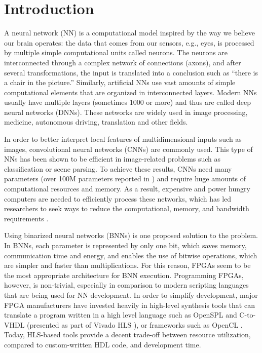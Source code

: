 \documentclass[conference]{IEEEtran}
\begin{document}
	\section{Introduction}
	A neural network (NN) \cite{Caudill:1989:NNP:69737.69743} \cite{Patterson:1998:ANN:521611} is a computational model inspired by the way we believe our brain operates: the data that comes from our sensors, e.g., eyes, is processed by multiple simple computational units called neurons. The neurons are interconnected through a complex network of connections (axons), and after several transformations, the input is translated into a conclusion such as ``there is a chair in the picture.'' Similarly, artificial NNs use vast amounts of simple computational elements that are organized in interconnected layers. Modern NNs usually have multiple layers (sometimes 1000 \cite{he2016deep} or more) and thus are called deep neural networks (DNNs). These networks are widely used in image processing, medicine, autonomous driving, translation and other fields.
	
	In order to better interpret local features of multidimensional inputs such as images, convolutional neural networks (CNNs) are commonly used. This type of NNs has been shown to be efficient in image-related problems such as classification or scene parsing. To achieve these results, CNNs need many parameters (over 100M parameters reported in \cite{DBLP:journals/corr/SimonyanZ14a}) and require huge amounts of computational resources and memory. As a result, expensive and power hungry computers are needed to efficiently process these networks, which has led researchers to seek ways to reduce the computational, memory, and bandwidth requirements \cite{DBLP:journals/corr/CourbariauxBD14} \cite{chen2015compressing} \cite{DBLP:journals/corr/HanMD15} \cite{gupta2015deep} \cite{DBLP:journals/corr/IandolaMAHDK16}.
	
	Using binarized neural networks (BNNs) \cite{golea1992learning} \cite{DBLP:journals/corr/KimS16} \cite{courbariaux2015binaryconnect} is one proposed solution to the problem. In BNNs, each parameter is represented by only one bit, which saves memory, communication time and energy, and enables the use of bitwise operations, which are simpler and faster than multiplications. For this reason, FPGAs seem to be the most appropriate architecture for BNN execution. Programming FPGAs, however, is non-trivial, especially in comparison to modern scripting languages that are being used for NN development. In order to simplify development, major FPGA manufacturers have invested heavily in high-level synthesis tools that can translate a program written in a high level language such as OpenSPL\cite{Becker2016} and C-to-VHDL (presented as part of Vivado HLS \cite{winterstein2013high}), or frameworks such as OpenCL \cite{munshi2009opencl} \cite{singh2011implementing}. Today, HLS-based tools provide a decent trade-off between resource utilization, compared to custom-written HDL code, and development time. 
	
\end{document}
